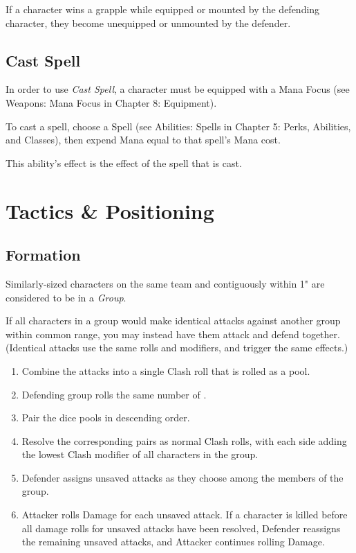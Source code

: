 If a character wins a grapple while equipped or mounted by the 
defending character, they become unequipped or unmounted by the defender.


\subsection{Cast Spell}
In order to use \textit{Cast Spell}, a character must be equipped with a Mana Focus (see Weapons: Mana Focus in Chapter 8: Equipment).

\vspace{0.4em}

To cast a spell, choose a Spell (see Abilities: Spells in Chapter 5: Perks, Abilities, and Classes),
then expend Mana equal to that spell's Mana cost. 

\vspace{0.4em}

This ability's effect is the effect of the spell that is cast.



\newpage

\section{Tactics \& Positioning}

\subsection{Formation}
Similarly-sized characters on the same team and 
contiguously within 1" are considered to be in a \textit{Group}.

\vspace{0.4em}

If all characters in a group would make identical attacks
against another group within common range, 
you may instead have them attack and defend together.
(Identical attacks use the same rolls and modifiers, 
and trigger the same effects.)

\begin{enumerate}
  \item Combine the attacks into a single Clash roll that is rolled as a 
     pool.
  \item Defending group rolls the same number of .
  \item Pair the dice pools in descending order.
  \item Resolve the corresponding pairs as normal Clash rolls, 
    with each side adding the lowest Clash modifier of all characters 
    in the group.
  \item Defender assigns unsaved attacks as they choose 
    among the members of the group.
  \item Attacker rolls Damage for each unsaved attack. 
    If a character is killed before all damage rolls for unsaved attacks 
    have been resolved, Defender reassigns the remaining unsaved attacks, 
    and Attacker continues rolling Damage.
\end{enumerate}



